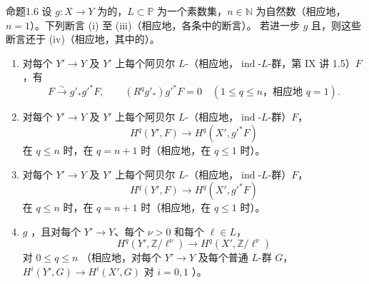 \begin{SGAresult}{命题}{1.6}
设 $g:X\to Y$ 为的，$L\subset\mathbb P$ 为一个素数集，$n\in\mathbb N$ 为自然数（相应地，$n=1$）。下列断言 (i) 至 (iii)（相应地，各条中的断言）。
若进一步 $g$ 且，则这些断言还于 (iv)（相应地，其中的）。
\begin{enumerate}
\item[(i)] 对每个 $Y'\to Y$ 及 $Y'$ 上每个阿贝尔 $L$-（相应地，$\operatorname{ind}$-$L$-群，第 IX 讲 1.5）$F$，有
\[
F\xrightarrow{\sim}g'_*g'^*F,\qquad (R^qg'_*)g'^*F=0\quad(1\leq q\leq n\text{，相应地 }q=1).
\]
\item[(ii)] 对每个 $Y'\to Y$ 及 $Y'$ 上每个阿贝尔 $L$-（相应地，$\operatorname{ind}$-$L$-群）$F$，
\[H^q(Y',F)\longrightarrow H^q(X',g'^*F)\]
在 $q\leq n$ 时，在 $q=n+1$ 时（相应地，在 $q\leq1$ 时）。
\item[(iii)] 对每个 $Y'\to Y$ 及 $Y'$ 上每个阿贝尔 $L$-（相应地，$\operatorname{ind}$-$L$-群）$F$，
\[H^q(Y',F)\longrightarrow H^q(X',g'^*F)\]
在 $q\leq n$ 时，在 $q=n+1$ 时（相应地，在 $q\leq1$ 时）。
\item[(iv)]  $g$ ，且对每个 $Y'\to Y$、每个 $\nu>0$ 和每个 $\ell\in L$，
\[H^q(Y',\mathbb Z/\ell^\nu)\longrightarrow H^q(X',\mathbb Z/\ell^\nu)\]
对 $0\leq q\leq n$ （相应地，对每个 $Y'\to Y$ 及每个普通 $L$-群 $G$， $H^i(Y',G)\to H^i(X',G)$ 对 $i=0,1$ ）。
\end{enumerate}
\end{SGAresult}
